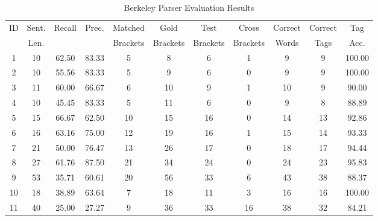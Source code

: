 \begin{table*}[htbp!]
\centering
\begin{tabular}{@{}ccccccccccc@{}}
\toprule
ID & Sent. & Recall & Prec. & Matched & Gold & Test & Cross & Correct & Correct & Tag \\
 & Len. & & & Brackets & Brackets & Brackets & Brackets & Words & Tags & Acc. \\
\midrule
1 & 10 & 62.50 & 83.33 & 5 & 8 & 6 & 1 & 9 & 9 & 100.00 \\
2 & 10 & 55.56 & 83.33 & 5 & 9 & 6 & 0 & 9 & 9 & 100.00 \\
3 & 11 & 60.00 & 66.67 & 6 & 10 & 9 & 1 & 10 & 9 & 90.00 \\
4 & 10 & 45.45 & 83.33 & 5 & 11 & 6 & 0 & 9 & 8 & 88.89 \\
5 & 15 & 66.67 & 62.50 & 10 & 15 & 16 & 0 & 14 & 13 & 92.86 \\
6 & 16 & 63.16 & 75.00 & 12 & 19 & 16 & 1 & 15 & 14 & 93.33 \\
7 & 21 & 50.00 & 76.47 & 13 & 26 & 17 & 0 & 18 & 17 & 94.44 \\
8 & 27 & 61.76 & 87.50 & 21 & 34 & 24 & 0 & 24 & 23 & 95.83 \\
9 & 53 & 35.71 & 60.61 & 20 & 56 & 33 & 6 & 43 & 38 & 88.37 \\
10 & 18 & 38.89 & 63.64 & 7 & 18 & 11 & 3 & 16 & 16 & 100.00 \\
11 & 40 & 25.00 & 27.27 & 9 & 36 & 33 & 16 & 38 & 32 & 84.21 \\
\bottomrule
\end{tabular}
\caption{Berkeley Parser Evaluation Results}
\label{tab:parser_eval}
\end{table*}
